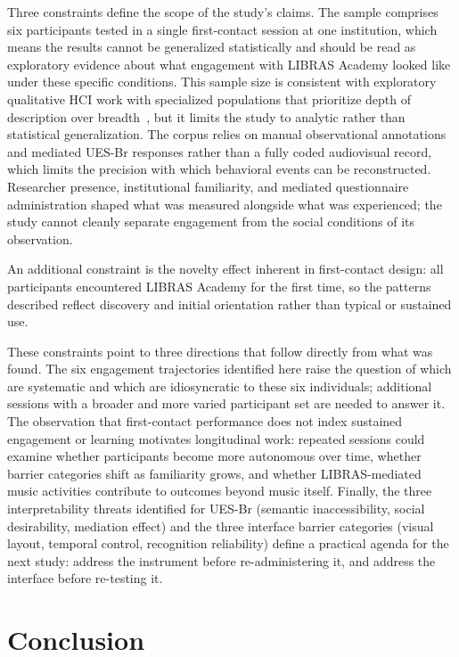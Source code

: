 \documentclass{llncs}
\begin{document}
Three constraints define the scope of the study's claims. The sample comprises six
participants tested in a single first-contact session at one institution, which means
the results cannot be generalized statistically and should be read as exploratory
evidence about what engagement with LIBRAS Academy looked like under these specific
conditions. This sample size is consistent with exploratory qualitative HCI work with
specialized populations that prioritize depth of description over
breadth~\cite{korte2014requirements,chuan2016smartsignplay}, but it limits the study to
analytic rather than statistical generalization. The corpus
relies on manual observational annotations and mediated UES-Br responses rather than a
fully coded audiovisual record, which limits the precision with which behavioral events
can be reconstructed. Researcher presence, institutional familiarity, and mediated questionnaire administration shaped what was measured alongside what was experienced; the study cannot cleanly separate engagement from the social conditions of its observation.

An additional constraint is the novelty effect inherent in first-contact design: all
participants encountered LIBRAS Academy for the first time, so the patterns described
reflect discovery and initial orientation rather than typical or sustained use.

These constraints point to three directions that follow directly from what was found.
The six engagement trajectories identified here raise the question of which are
systematic and which are idiosyncratic to these six individuals; additional sessions
with a broader and more varied participant set are needed to answer it. The observation that
first-contact performance does not index sustained engagement or learning motivates
longitudinal work: repeated sessions could examine whether participants become more
autonomous over time, whether barrier categories shift as familiarity grows, and whether
LIBRAS-mediated music activities contribute to outcomes beyond music itself. Finally,
the three interpretability threats identified for UES-Br (semantic inaccessibility,
social desirability, mediation effect) and the three interface barrier categories
(visual layout, temporal control, recognition reliability) define a practical agenda for
the next study: address the instrument before re-administering it, and address the
interface before re-testing it.

\section{Conclusion}
\end{document}
